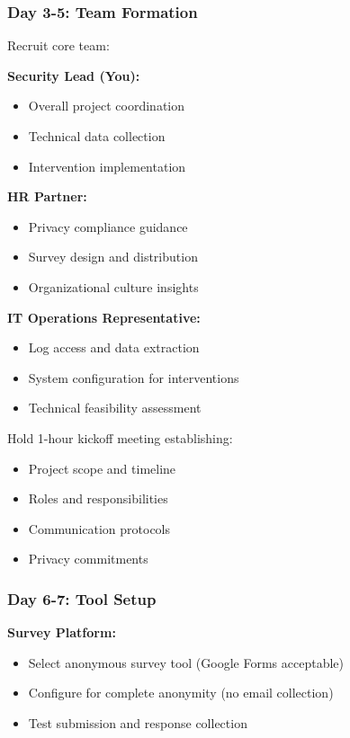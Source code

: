 \documentclass[11pt,a4paper]{article}
\begin{document}
\subsubsection{Day 3-5: Team Formation}

Recruit core team:

\textbf{Security Lead (You):}
\begin{itemize}
\item Overall project coordination
\item Technical data collection
\item Intervention implementation
\end{itemize}

\textbf{HR Partner:}
\begin{itemize}
\item Privacy compliance guidance
\item Survey design and distribution
\item Organizational culture insights
\end{itemize}

\textbf{IT Operations Representative:}
\begin{itemize}
\item Log access and data extraction
\item System configuration for interventions
\item Technical feasibility assessment
\end{itemize}

Hold 1-hour kickoff meeting establishing:
\begin{itemize}
\item Project scope and timeline
\item Roles and responsibilities
\item Communication protocols
\item Privacy commitments
\end{itemize}

\subsubsection{Day 6-7: Tool Setup}

\textbf{Survey Platform:}
\begin{itemize}
\item Select anonymous survey tool (Google Forms acceptable)
\item Configure for complete anonymity (no email collection)
\item Test submission and response collection
\end{itemize}
\end{document}
